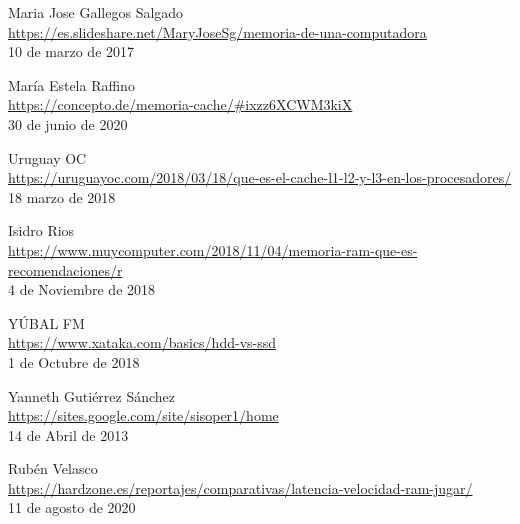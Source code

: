 \documentclass[10pt,letterpaper]{article}
\begin{document}
\begin{thebibliography}{0}
	
	
	Maria Jose Gallegos Salgado\\
	\url{ https://es.slideshare.net/MaryJoseSg/memoria-de-una-computadora }\\
	10 de marzo de 2017
	
	María Estela Raffino\\
	\url{ https://concepto.de/memoria-cache/#ixzz6XCWM3kiX }\\
	30 de junio de 2020
	
	Uruguay OC\\
	\url{ https://uruguayoc.com/2018/03/18/que-es-el-cache-l1-l2-y-l3-en-los-procesadores/}\\
	18 marzo de 2018
	
	Isidro Rios\\
	\url{ https://www.muycomputer.com/2018/11/04/memoria-ram-que-es-recomendaciones/r}\\
	4 de Noviembre de 2018
	
	YÚBAL FM\\
	\url{ https://www.xataka.com/basics/hdd-vs-ssd }\\
	1 de Octubre de 2018
		
	Yanneth Gutiérrez Sánchez\\
	\url{https://sites.google.com/site/sisoper1/home}\\
	14 de Abril de 2013
	
	Rubén Velasco\\
	\url{ https://hardzone.es/reportajes/comparativas/latencia-velocidad-ram-jugar/}\\
	11 de agosto de 2020\\
	
	
	
\end{thebibliography}
\end{document}
